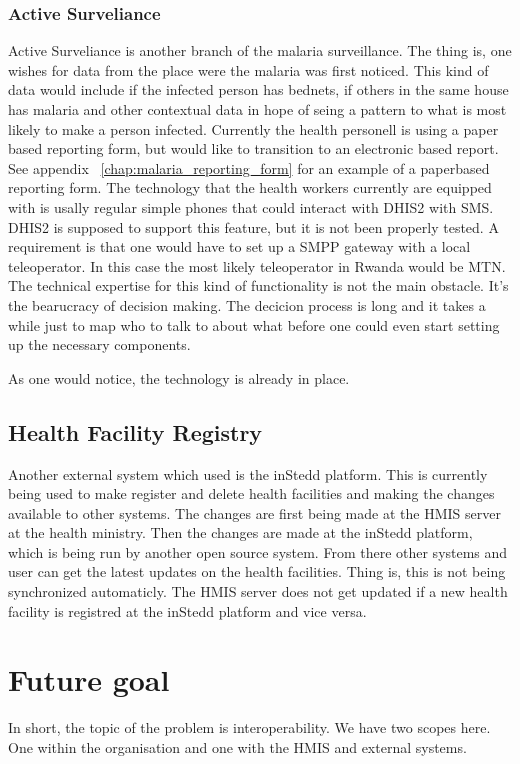 \subsubsection{Active Surveliance}
Active Surveliance is another branch of the malaria surveillance. The thing is, one wishes for data from the place were the malaria was first noticed.
This kind of data would include if the infected person has bednets, if others in the same house has malaria and other contextual data in hope of seing a pattern to what is most likely to make a person infected. 
Currently the health personell is using a paper based reporting form, but would like to transition to an electronic based report. See appendix ~\ref{chap:malaria_reporting_form} for an example of a paperbased reporting form.
The technology that the health workers currently are equipped with is usally regular simple phones that could interact with DHIS2 with SMS. 
DHIS2 is supposed to support this feature, but it is not been properly tested. 
A requirement is that one would have to set up a SMPP gateway with a local teleoperator. In this case the most likely teleoperator in Rwanda would be MTN.
The technical expertise for this kind of functionality is not the main obstacle. It's the bearucracy of decision making. 
The decicion process is long and it takes a while just to map who to talk to about what before one could even start setting up the necessary components.

As one would notice, the technology is already in place.
\subsection{Health Facility Registry}
Another external system which used is the inStedd platform. This is currently being used to make register and delete health facilities and making the changes available to other systems.
The changes are first being made at the HMIS server at the health ministry. Then the changes are made at the inStedd platform, which is being run by another open source system.
From there other systems and user can get the latest updates on the health facilities. Thing is, this is not being synchronized automaticly.
The HMIS server does not get updated if a new health facility is registred at the inStedd platform and vice versa.
\section{Future goal}
In short, the topic of the problem is interoperability. We have two scopes here. One within the organisation and one with the HMIS and external systems.
